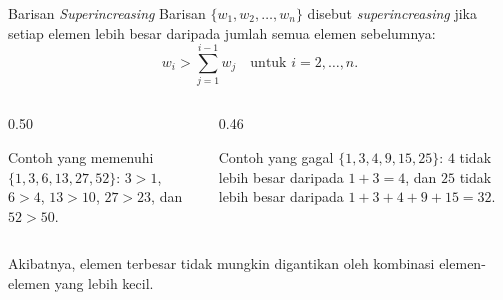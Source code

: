 \documentclass[aspectratio=169,11pt]{beamer}
\begin{document}
\begin{frame}{Barisan \textit{Superincreasing}}
    Barisan $\{w_1, w_2, \dots, w_n\}$ disebut \textit{superincreasing} jika
    setiap elemen lebih besar daripada jumlah semua elemen sebelumnya:
    \[
        w_i > \sum_{j=1}^{i-1} w_j
        \quad \text{untuk } i = 2, \dots, n.
    \]
    \begin{columns}[T,onlytextwidth]
        \begin{column}{0.50\textwidth}
            \begin{exampleblock}{Contoh yang memenuhi}
                \footnotesize
                $\{1,3,6,13,27,52\}$:
                $3>1$, $6>4$, $13>10$, $27>23$, dan $52>50$.
            \end{exampleblock}
        \end{column}
        \begin{column}{0.46\textwidth}
            \begin{alertblock}{Contoh yang gagal}
                \footnotesize
                $\{1,3,4,9,15,25\}$:
                $4$ tidak lebih besar daripada $1+3=4$, dan $25$ tidak lebih
                besar daripada $1+3+4+9+15=32$.
            \end{alertblock}
        \end{column}
    \end{columns}
    \vspace{0.05cm}
    \footnotesize
    Akibatnya, elemen terbesar tidak mungkin digantikan oleh kombinasi
    elemen-elemen yang lebih kecil.
\end{frame}
\end{document}
